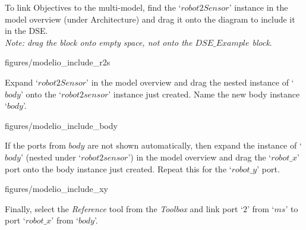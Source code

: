 \documentclass[11pt,a4paper]{../tutorial}
\begin{document}
\begin{instructions}
\newpage

\item To link Objectives to the multi-model, find the `$robot2Sensor$' instance in the model overview (under Architecture) and drag it onto the diagram to include it in the DSE. \\ \textit{Note: drag the block onto empty space, not onto the $\mathit{DSE\_Example}$ block}.

\begin{center}
\begin{annotation}[width=0.7\linewidth]{figures/modelio_include_r2s}
    \end{annotation}
\end{center}

\item Expand `$robot2Sensor$' in the model overview and drag the nested instance of `$body$' onto the `$robot2sensor$' instance just created. Name the new body instance `$body$'. 

\begin{center}
\begin{annotation}[width=0.8\linewidth]{figures/modelio_include_body}
    \end{annotation}
\end{center}

\newpage

\item If the ports from $body$ are not shown automatically, then expand the instance of `$body$' (nested under `$robot2sensor$') in the model overview and drag the `$robot\_x$' port onto the body instance just created. Repeat this for the `$robot\_y$' port.

\begin{center}
\begin{annotation}[width=0.7\linewidth]{figures/modelio_include_xy}
    \end{annotation}
\end{center}

\item \label{obj_link} Finally, select the \emph{Reference} tool from the \emph{Toolbox} and link port `$2$' from `$ms$' to port `$robot\_x$' from `$body$'. 


\end{instructions}
\end{document}
